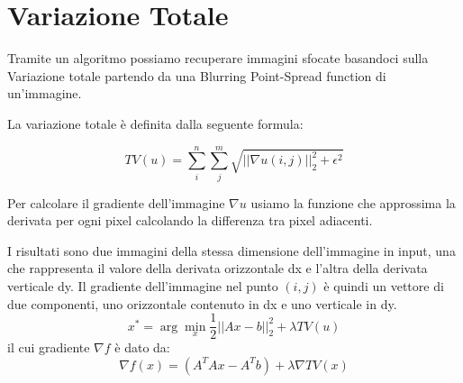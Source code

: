 \section{Variazione Totale}
Tramite un algoritmo possiamo recuperare immagini sfocate basandoci sulla Variazione totale partendo da una Blurring Point-Spread function di un'immagine. 

La variazione totale è definita dalla seguente formula:                                                                                

\[TV(u) = \sum_i^n{\sum_j^m{\sqrt{||\nabla u(i, j)||_2^2 + \epsilon^2}}}\]

Per calcolare il gradiente dell'immagine $\nabla u$ usiamo la funzione  che approssima la derivata per ogni pixel calcolando la differenza tra pixel adiacenti. 

I risultati sono due immagini della stessa dimensione dell'immagine in input, una che rappresenta il valore della derivata orizzontale dx e l'altra della derivata verticale dy. Il gradiente dell'immagine nel punto $(i, j)$ è quindi un vettore di due componenti, uno orizzontale contenuto in dx e uno verticale in dy.
\[x^* = \arg\min_x \frac{1}{2} ||Ax - b||_2^2 + \lambda TV(u)\] 
il cui gradiente $\nabla f$ è dato da: 
\[\nabla f(x) = (A^TAx - A^Tb)  + \lambda \nabla TV(x)\]

